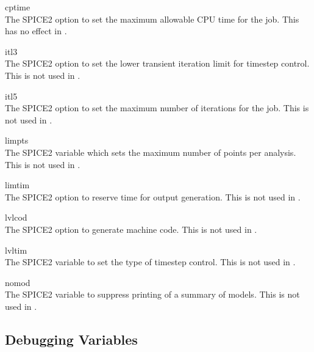 \begin{description}
\item{\et cptime}\\
The SPICE2 option to set the maximum allowable CPU time for the job.
This has no effect in {\WRspice}.

\item{\et itl3}\\
The SPICE2 option to set the lower transient iteration limit for
timestep control.  This is not used in {\WRspice}.

\item{\et itl5}\\
The SPICE2 option to set the maximum number of iterations for the job. 
This is not used in {\WRspice}.

\item{\et limpts}\\
The SPICE2 variable which sets the maximum number of points per
analysis.  This is not used in {\WRspice}.

\item{\et limtim}\\
The SPICE2 option to reserve time for output generation.  This is not
used in {\WRspice}.
 
\item{\et lvlcod}\\
The SPICE2 option to generate machine code.  This is not used in
{\WRspice}.

\item{\et lvltim}\\
The SPICE2 variable to set the type of timestep control.  This is not
used in {\WRspice}.

\item{\et nomod}\\
The SPICE2 variable to suppress printing of a summary of models.  This
is not used in {\WRspice}.

\end{description}

\subsection{Debugging Variables}


